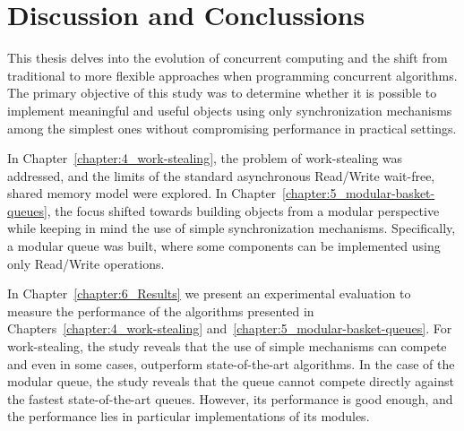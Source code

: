 \chapter{Discussion and Conclussions}

This thesis delves into the evolution of concurrent computing and the shift from traditional to more flexible approaches when programming concurrent algorithms. The primary objective of this study was to determine whether it is possible to implement meaningful and useful objects using only synchronization mechanisms among the simplest ones without compromising performance in practical settings.

In Chapter~\ref{chapter:4_work-stealing}, the problem of work-stealing was addressed, and the limits of the standard asynchronous Read/Write wait-free, shared memory model were explored. In Chapter~\ref{chapter:5_modular-basket-queues}, the focus shifted towards building objects from a modular perspective while keeping in mind the use of simple synchronization mechanisms. Specifically, a modular queue was built, where some components can be implemented using only Read/Write operations.


In Chapter~\ref{chapter:6_Results} we present an experimental evaluation to measure the performance of the algorithms presented in Chapters~\ref{chapter:4_work-stealing} and~\ref{chapter:5_modular-basket-queues}. For work-stealing, the study reveals that the use of simple mechanisms can compete and even in some cases, outperform state-of-the-art algorithms. In the case of the modular queue, the study reveals that the queue cannot compete directly against the fastest state-of-the-art queues. However, its performance is good enough, and the performance lies in particular implementations of its modules.

